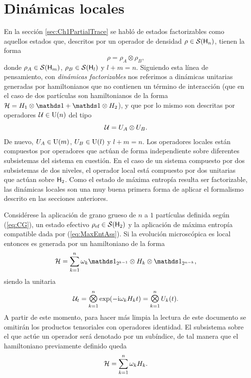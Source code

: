 \section{Dinámicas locales}

En la sección \ref{sec:Ch1PartialTrace} se habló de estados factorizables como aquellos estados que, descritos por un operador de densidad $\rho\in\mathcal{S}({\sf H}_{n})$, tienen la forma
\begin{equation}
    \rho=\rho_{A}\otimes\rho_{B},\nonumber
\end{equation}
donde $\rho_{A}\in\mathcal{S}({\sf H}_{m})$, $\rho_{B}\in\mathcal{S}({\sf H}_{l})$ y $l+m=n$. Siguiendo esta línea de pensamiento, con \textit{dinámicas factorizables} nos referimos a dinámicas unitarias generadas por hamiltonianos que no contienen un término de interacción (que en el caso de dos partículas son hamiltonianos de la forma $\mcH=H_{1}\otimes\Id+\Id\otimes H_{2}$), y que por lo mismo son descritas por operadores $\mathcal{U}\in\text{U}(n)$  del tipo
\begin{equation}
    \mathcal{U}=U_{A}\otimes U_{B}.\nonumber
\end{equation}
De nuevo, $U_{A}\in\text{U}(m)$, $U_{B}\in\text{U}(l)$ y $l+m=n$. Los operadores locales están compuestos por operadores que actúan de forma independiente sobre diferentes subsistemas del sistema en cuestión. En el caso de un sistema compuesto por dos subsistemas de dos niveles, el operador local está compuesto por dos unitarias que actúan sobre ${\sf H}_{2}$. Como el estado de máxima entropía resulta ser factorizable, las dinámicas locales son una muy buena primera forma de aplicar el formalismo descrito en las secciones anteriores.

Considérese la aplicación de grano grueso de $n$ a $1$ partículas definida según (\ref{eq:CG}), un estado efectivo $\rho_{\text{ef}}\in\mathcal{S}({\sf H}_{2})$ y la aplicación de máxima entropía compatible dada por (\ref{eq:MaxEntAss}). Si la evolución microscópica es local entonces es generada por un hamiltoniano de la forma
\begin{equation}
    \mcH=\sum_{k=1}^{n}\omega_{k}\Id_{2^{k-1}}\otimes H_{k} \otimes \Id_{2^{n-k}},\nonumber
\end{equation}
siendo la unitaria 
\begin{equation}\label{eq:NFactorUnitaries}
    \mcU_{t}=\Motimes_{k=1}^{n}\text{exp}\qty(-\rmi\omega_{k}H_{k}t)=\Motimes_{k=1}^{n} U_{k}(t).
\end{equation}
A partir de este momento, para hacer más limpia la lectura de este documento se omitirán los productos tensoriales con operadores identidad. El subsistema sobre el que actúe un operador será denotado por un subíndice, de tal manera que el hamiltoniano previamente definido queda
\begin{equation}
    \mathcal{H}=\sum_{k=1}^{n}\omega_{k}H_{k}.\nonumber
\end{equation}


